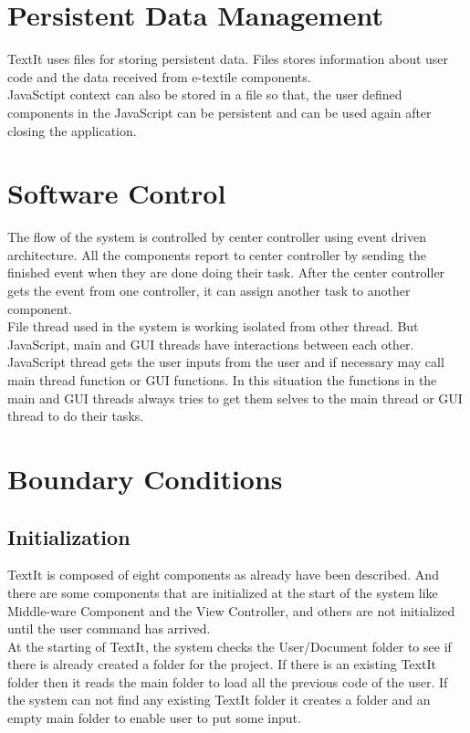 \section{Persistent Data Management}
	TextIt uses files for storing persistent data. Files stores information about user code and the data received from e-textile components. \\
	JavaSctipt context can also be stored in a file so that, the user defined components in the JavaScript can be persistent and can be used again after closing the application. 
	
\section{Software Control}
The flow of the system is controlled by center controller using event driven architecture. All the components report to center controller by sending the finished event when they are done doing their task. After the center controller gets the event from one controller, it can assign another task to another component. \\

File thread used in the system is working isolated from other thread. But JavaScript, main and GUI threads have interactions between each other. JavaScript thread gets the user inputs from the user and if necessary may call main thread function or GUI functions. In this situation the functions in the main and GUI threads always tries to get them selves to the main thread or GUI thread to do their tasks. 

\section{Boundary Conditions}

\subsection{Initialization}
TextIt is composed of eight components as already have been described. And there are some components that are initialized at the start of the system like Middle-ware Component and the View Controller, and others are not initialized until the user command has arrived. \\

At the starting of TextIt, the system checks the User/Document folder to see if there is already created a folder for the project. If there is an existing TextIt folder then it reads the main folder to load all the previous code of the user. If the system can not find any existing TextIt folder it creates a folder and an empty main folder to enable user to put some input. \\

